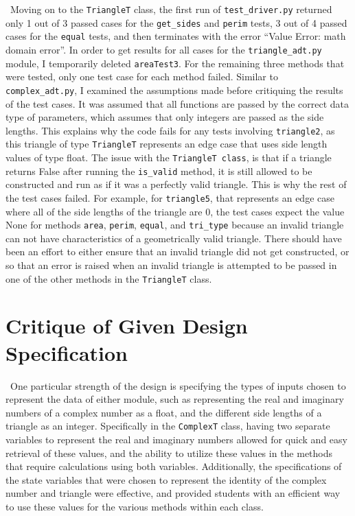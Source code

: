\documentclass[12pt]{article}
\begin{document}
~\newline\noindent Moving on to the \verb |TriangleT| class, the first run of \verb |test_driver.py| returned only 1 out of 3 passed cases for the \verb |get_sides| and \verb |perim| tests, 3 out of 4 passed cases for the \verb |equal| tests, and then terminates with the error “Value Error: math domain error”. In order to get results for all cases for the \verb |triangle_adt.py| module, I temporarily deleted \verb |areaTest3|. For the remaining three methods that were tested, only one test case for each method failed. Similar to \verb |complex_adt.py|, I examined the assumptions made before critiquing the results of the test cases. It was assumed that all functions are passed by the correct data type of parameters, which assumes that only integers are passed as the side lengths. This explains why the code fails for any tests involving \verb |triangle2|, as this triangle of type \verb |TriangleT| represents an edge case that uses side length values of type float. The issue with the \verb |TriangleT class|, is that if a triangle returns False after running the \verb |is_valid| method, it is still allowed to be constructed and run as if it was a perfectly valid triangle. This is why the rest of the test cases failed. For example, for \verb |triangle5|, that represents an edge case where all of the side lengths of the triangle are 0, the test cases expect the value None for methods \verb |area|, \verb |perim|, \verb |equal|, and \verb |tri_type| because an invalid triangle can not have characteristics of a geometrically valid triangle. There should have been an effort to either ensure that an invalid triangle did not get constructed, or so that an error is raised when an invalid triangle is attempted to be passed in one of the other methods in the \verb |TriangleT| class.

\section{Critique of Given Design Specification}

~\newline\noindent One particular strength of the design is specifying the types of inputs chosen to represent the data of either module, such as representing the real and imaginary numbers of a complex number as a float, and the different side lengths of a triangle as an integer. Specifically in the \verb |ComplexT| class, having two separate variables to represent the real and imaginary numbers allowed for quick and easy retrieval of these values, and the ability to utilize these values in the methods that require calculations using both variables. Additionally, the specifications of the state variables that were chosen to represent the identity of the complex number and triangle were effective, and provided students with an efficient way to use these values for the various methods within each class.
\end{document}
